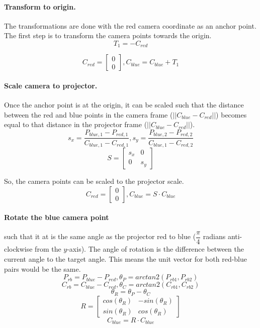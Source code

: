 \documentclass[12pt]{article}
\begin{document}
\paragraph{Transform to origin.} The transformations are done with the red camera coordinate as an anchor point. The first step is to transform the camera points towards the origin. 
\[
T_1 = -C_{red}
\]

\[
C_{red} =  
\begin{bmatrix}
0 \\ 
0
\end{bmatrix},
C_{blue} = C_{blue} + T_1
\]

\paragraph{Scale camera to projector.} Once the anchor point is at the origin, it can be scaled such that the distance between the red and blue points in the camera frame ($||C_{blue}-C_{red}||$) becomes equal to that distance in the projector frame ($||C_{blue}-C_{red}||$).
\[
s_x = \dfrac{ P_{blue,1} - P_{red,1} }{ C_{blue,1} - C_{red,1} },
s_y = \dfrac{ P_{blue,2} - P_{red,2} }{ C_{blue,1} - C_{red,2} }
\]
\[
S = 
\begin{bmatrix}
s_x & 0 \\
0 & s_y
\end{bmatrix}
\]

So, the camera points can be scaled to the projector scale.
\[
C_{red} = 
\begin{bmatrix}
0 \\
0
\end{bmatrix},
C_{blue} = S \cdot C_{blue}
\]

\paragraph{Rotate the blue camera point} such that it at is the same angle as the projector red to blue ($\dfrac{\pi}{4}$ radians anti-clockwise from the $y$-axis). The angle of rotation is the difference between the current angle to the target angle. This means the unit vector for both red-blue pairs would be the same.
\[
P_{rb} = P_{blue} - P_{red},
\theta_P = arctan2(P_{rb1}, P_{rb2})
\]
\[
C_{rb} = C_{blue} - C_{red},
\theta_C = arctan2(C_{rb1}, C_{rb2})
\]
\[
\theta_R = \theta_P - \theta_C
\]
\[
R = 
\begin{bmatrix}
cos(\theta_R) & -sin(\theta_R) \\
sin(\theta_R) & cos(\theta_R)
\end{bmatrix}
\]
\[
C_{blue} = R \cdot C_{blue}
\]
\end{document}
